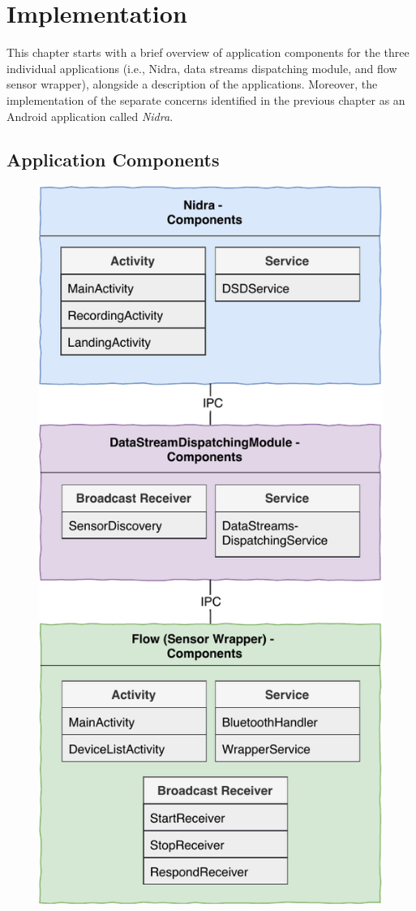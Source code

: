 \chapter{Implementation}
This chapter starts with a brief overview of application components for the three individual applications (i.e., Nidra, data streams dispatching module, and flow sensor wrapper), alongside a description of the applications. Moreover, the implementation of the separate concerns identified in the previous chapter as an Android application called \textit{Nidra}. 

\section{Application Components} \label{impl:appcomp}

\begin{figure}
    \centering
    \includegraphics[scale=0.95]{images/Android_Components.pdf}

\end{figure}
